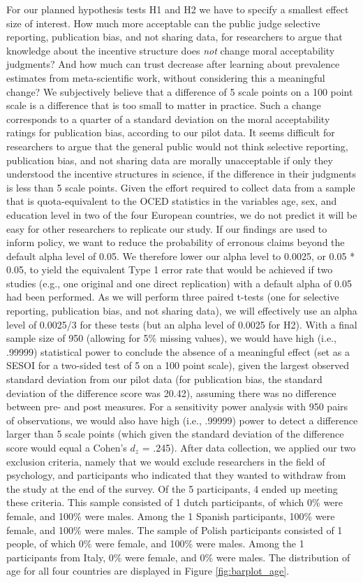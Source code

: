 \documentclass[
  man,floatsintext]{apa7}
\begin{document}
For our planned hypothesis tests H1 and H2 we have to specify a smallest effect size of
interest. How much more acceptable can the public judge selective reporting, publication
bias, and not sharing data, for researchers to argue that knowledge about the incentive
structure does \emph{not} change moral acceptability judgments? And how much can trust
decrease after learning about prevalence estimates from meta-scientific work, without
considering this a meaningful change? We subjectively believe that a difference of 5 scale
points on a 100 point scale is a difference that is too small to matter in practice. Such a
change corresponds to a quarter of a standard deviation on the moral acceptability ratings
for publication bias, according to our pilot data. It seems difficult for researchers to argue
that the general public would not think selective reporting, publication bias, and not sharing
data are morally unacceptable if only they understood the incentive structures in science, if
the difference in their judgments is less than 5 scale points.
Given the effort required to collect data from a sample that is quota-equivalent to the
OCED statistics in the variables age, sex, and education level in two of the four European
countries, we do not predict it will be easy for other researchers to replicate our study. If
our findings are used to inform policy, we want to reduce the probability of erronous claims
beyond the default alpha level of 0.05. We therefore lower our alpha level to 0.0025, or
0.05 * 0.05, to yield the equivalent Type 1 error rate that would be achieved if two studies
(e.g., one original and one direct replication) with a default alpha of 0.05 had been
performed. As we will perform three paired t-tests (one for selective reporting, publication
bias, and not sharing data), we will effectively use an alpha level of 0.0025/3 for these
tests (but an alpha level of 0.0025 for H2). With a final sample size of 950 (allowing for 5\%
missing values), we would have high (i.e., .99999) statistical power to conclude
the absence of a meaningful effect (set as a SESOI for a two-sided test of 5 on a 100 point
scale), given the largest observed standard deviation from our pilot data (for publication
bias, the standard deviation of the difference score was 20.42), assuming there was no
difference between pre- and post measures. For a sensitivity power analysis with 950 pairs of observations, we would also have high (i.e., .99999) power to detect a difference larger than 5 scale points (which
given the standard deviation of the difference score would equal a Cohen's \(d_z\) = .245).
After data collection, we applied our two exclusion criteria, namely that we would exclude researchers in the field of psychology, and participants who indicated that they wanted to withdraw from the study at the end of the survey.
Of the 5 participants, 4 ended up meeting these criteria. This sample consisted of 1 dutch participants, of which 0\% were female, and 100\% were males. Among the 1 Spanish participants, 100\% were female, and 100\% were males. The sample of Polish participants consisted of 1 people, of which 0\% were female, and 100\% were males. Among the 1 participants from Italy, 0\% were female, and 0\% were males. The distribution of age for all four countries are displayed in Figure \ref{fig:barplot_age}.
\end{document}
